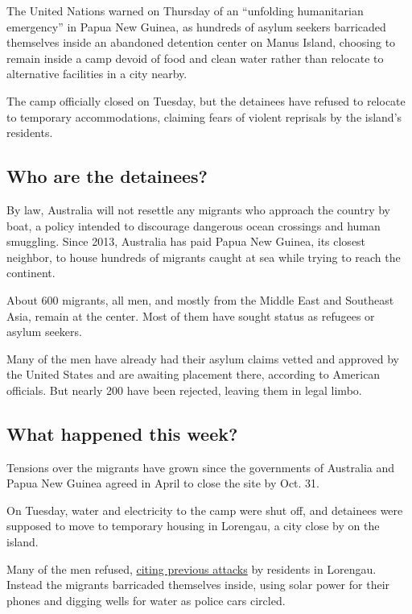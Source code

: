 The United Nations warned on Thursday of an ``unfolding humanitarian
emergency'' in Papua New Guinea, as hundreds of asylum seekers
barricaded themselves inside an abandoned detention center on Manus
Island, choosing to remain inside a camp devoid of food and clean water
rather than relocate to alternative facilities in a city nearby.

The camp officially closed on Tuesday, but the detainees have refused to
relocate to temporary accommodations, claiming fears of violent
reprisals by the island's residents.

\hypertarget{who-are-the-detainees}{%
\subsection{Who are the detainees?}\label{who-are-the-detainees}}

By law, Australia will not resettle any migrants who approach the
country by boat, a policy intended to discourage dangerous ocean
crossings and human smuggling. Since 2013, Australia has paid Papua New
Guinea, its closest neighbor, to house hundreds of migrants caught at
sea while trying to reach the continent.

About 600 migrants, all men, and mostly from the Middle East and
Southeast Asia, remain at the center. Most of them have sought status as
refugees or asylum seekers.

Many of the men have already had their asylum claims vetted and approved
by the United States and are awaiting placement there, according to
American officials. But nearly 200 have been rejected, leaving them in
legal limbo.

\hypertarget{what-happened-this-week}{%
\subsection{What happened this week?}\label{what-happened-this-week}}

Tensions over the migrants have grown since the governments of Australia
and Papua New Guinea agreed in April to close the site by Oct. 31.

On Tuesday, water and electricity to the camp were shut off, and
detainees were supposed to move to temporary housing in Lorengau, a city
close by on the island.

Many of the men refused,
\href{https://www.nytimes.com/2017/10/25/world/australia/australia-manus-refugees.html}{citing
previous attacks} by residents in Lorengau. Instead the migrants
barricaded themselves inside, using solar power for their phones and
digging wells for water as police cars circled.

